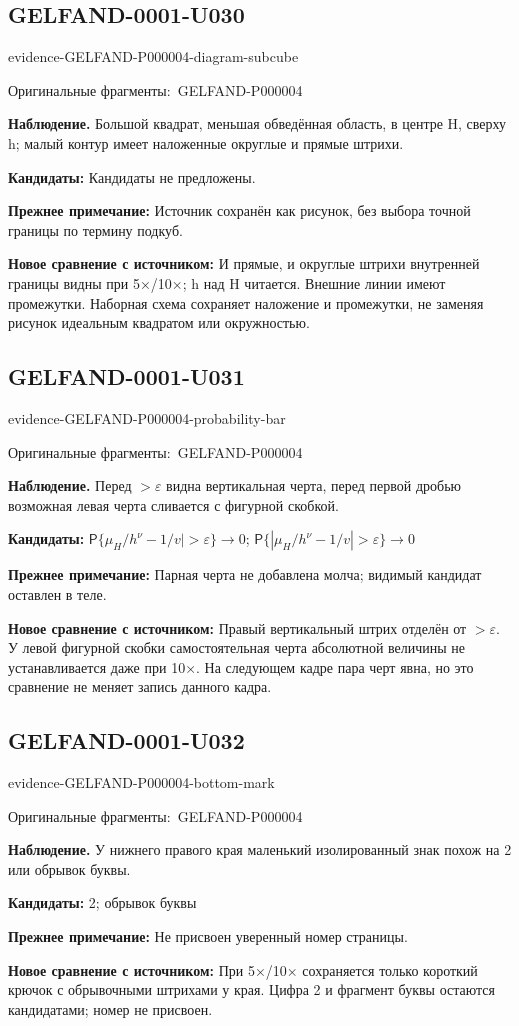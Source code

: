 \documentclass[11pt]{article}
\newcommand{\EvidenceBlock}[4]{%
 \par\smallskip\noindent\begin{minipage}{\linewidth}
 \begin{minipage}[t]{.47\linewidth}\vspace{0pt}\centering
 \csname evidence-#1-#2\endcsname\par
 {\scriptsize\SourceCropCaption\ #1}\par
 \end{minipage}\hfill
 \begin{minipage}[t]{.49\linewidth}\vspace{0pt}\raggedright
 {\small\color{orange!65!black}\textbf{#4} #3}\par
 \end{minipage}
 \end{minipage}\par\smallskip}
\newcommand{\SourceCropCaption}{Оригинальные фрагменты:}\newcommand{\ReadingCaption}{Сомнительное чтение.}\newcommand{\IncompleteCaption}{Неразобранный фрагмент.}\newcommand{\DiagramCaption}{Рисунок и набранное описание.}
\begin{document}
\subsection*{GELFAND-0001-U030}
\EvidenceBlock{GELFAND-P000004}{diagram-subcube}{Большой квадрат, меньшая обведённая область, в центре H, сверху h; малый контур имеет наложенные округлые и прямые штрихи.}{Наблюдение.}
\par\smallskip\noindent\textbf{Кандидаты: } Кандидаты не предложены.\par
\par\smallskip\noindent\textbf{Прежнее примечание: } Источник сохранён как рисунок, без выбора точной границы по термину подкуб.\par
\par\smallskip\noindent\textbf{Новое сравнение с источником: } И прямые, и округлые штрихи внутренней границы видны при 5×/10×; h над H читается. Внешние линии имеют промежутки. Наборная схема сохраняет наложение и промежутки, не заменяя рисунок идеальным квадратом или окружностью.\par

\subsection*{GELFAND-0001-U031}
\EvidenceBlock{GELFAND-P000004}{probability-bar}{Перед \(>\varepsilon\) видна вертикальная черта, перед первой дробью возможная левая черта сливается с фигурной скобкой.}{Наблюдение.}
\par\smallskip\noindent\textbf{Кандидаты: } \(\mathsf P\{\mu_H/h^\nu-1/v\mid>\varepsilon\}\to0\); \(\mathsf P\{|\mu_H/h^\nu-1/v|>\varepsilon\}\to0\)\par
\par\smallskip\noindent\textbf{Прежнее примечание: } Парная черта не добавлена молча; видимый кандидат оставлен в теле.\par
\par\smallskip\noindent\textbf{Новое сравнение с источником: } Правый вертикальный штрих отделён от \(>\varepsilon\). У левой фигурной скобки самостоятельная черта абсолютной величины не устанавливается даже при 10×. На следующем кадре пара черт явна, но это сравнение не меняет запись данного кадра.\par

\subsection*{GELFAND-0001-U032}
\EvidenceBlock{GELFAND-P000004}{bottom-mark}{У нижнего правого края маленький изолированный знак похож на 2 или обрывок буквы.}{Наблюдение.}
\par\smallskip\noindent\textbf{Кандидаты: } 2; обрывок буквы\par
\par\smallskip\noindent\textbf{Прежнее примечание: } Не присвоен уверенный номер страницы.\par
\par\smallskip\noindent\textbf{Новое сравнение с источником: } При 5×/10× сохраняется только короткий крючок с обрывочными штрихами у края. Цифра 2 и фрагмент буквы остаются кандидатами; номер не присвоен.\par
\end{document}
